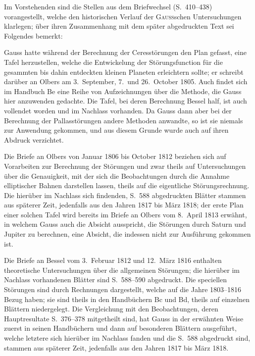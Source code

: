 \documentclass[10pt,a4paper]{article}
\begin{document}
Im Vorstehenden sind die Stellen aus dem Briefwechsel (S.~410--438) vorangestellt, welche den historischen Verlauf der \textsc{Gauss}schen Untersuchungen klarlegen; \"uber ihren Zusammenhang mit dem sp\"ater abgedruckten Text sei Folgendes bemerkt:

Gauss hatte w\"ahrend der Berechnung der Ceresst\"orungen den Plan gefasst, eine Tafel herzustellen, welche die Entwickelung der St\"orungsfunction f\"ur die gesammten bis dahin entdeckten kleinen Planeten erleichtern sollte; er schreibt dar\"uber an Olbers am 3.~September, 7.~und 26.~October 1805. Auch findet sich im Handbuch Be eine Reihe von Aufzeichnungen \"uber die Methode, die Gauss hier anzuwenden gedachte. Die Tafel, bei deren Berechnung Bessel half, ist auch vollendet worden und im Nachlass vorhanden. Da Gauss dann aber bei der Berechnung der Pallasst\"orungen andere Methoden anwandte, so ist sie niemals zur Anwendung gekommen, und aus diesem Grunde wurde auch auf ihren Abdruck verzichtet.

Die Briefe an Olbers von Januar 1806 bis October 1812 beziehen sich auf Vorarbeiten zur Berechnung der St\"orungen und zwar theils auf Untersuchungen \"uber die Genauigkeit, mit der sich die Beobachtungen durch die Annahme elliptischer Bahnen darstellen lassen, theils auf die eigentliche St\"orungsrechnung. Die hier\"uber im Nachlass sich findenden, S.~588 abgedruckten Bl\"atter stammen aus sp\"aterer Zeit, jedenfalls aus den Jahren 1817 bis M\"arz 1818; der erste Plan einer solchen Tafel wird bereits im Briefe an Olbers vom 8.~April 1813 erw\"ahnt, in welchem Gauss auch die Absicht ausspricht, die St\"orungen durch Saturn und Jupiter zu berechnen, eine Absicht, die indessen nicht zur Ausf\"uhrung gekommen ist.

\newpage
Die Briefe an Bessel vom 3.~Februar 1812 und 12.~M\"arz 1816 enthalten theoretische Untersuchungen \"uber die allgemeinen St\"orungen; die hier\"uber im Nachlass vorhandenen Bl\"atter sind S.~588--590 abgedruckt. Die speciellen St\"orungen sind durch Rechnungen dargestellt, welche auf die Jahre 1803--1816 Bezug haben; sie sind theils in den Handb\"uchern Bc und Bd, theils auf einzelnen Bl\"attern niedergelegt. Die Vergleichung mit den Beobachtungen, deren Hauptresultate S.~376--378 mitgetheilt sind, hat Gauss in der erw\"ahnten Weise zuerst in seinen Handb\"uchern und dann auf besonderen Bl\"attern ausgef\"uhrt, welche letztere sich hier\"uber im Nachlass fanden und die S.~588 abgedruckt sind, stammen aus sp\"aterer Zeit, jedenfalls aus den Jahren 1817 bis M\"arz 1818.
\end{document}
